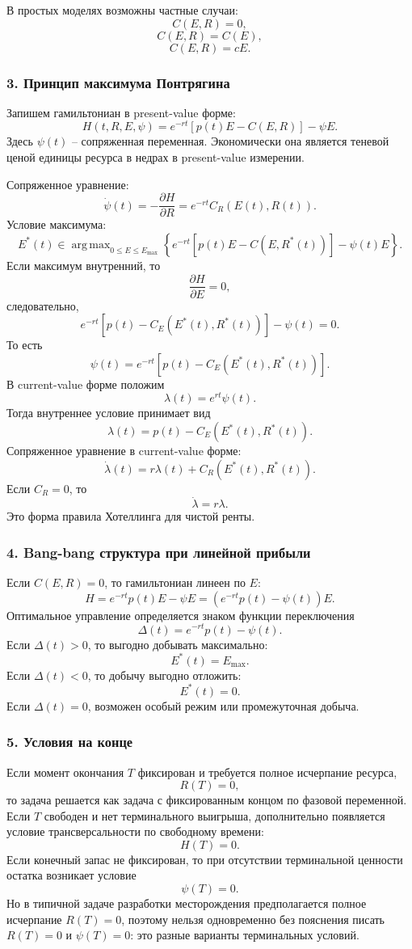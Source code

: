 \documentclass[12pt,a4paper]{article}
\DeclareMathOperator*{\argmax}{arg\,max}
\begin{document}
В простых моделях возможны частные случаи:
\[
C(E,R)=0,
\]
\[
C(E,R)=C(E),
\]
\[
C(E,R)=cE.
\]

\subsubsection*{3. Принцип максимума Понтрягина}
Запишем гамильтониан в present-value форме:
\[
H(t,R,E,\psi)=e^{-rt}\left[p(t)E-C(E,R)\right]-\psi E.
\]
Здесь $\psi(t)$ -- сопряженная переменная. Экономически она является теневой ценой единицы ресурса в недрах в present-value измерении.

Сопряженное уравнение:
\[
\dot\psi(t)=-\frac{\partial H}{\partial R}=e^{-rt}C_R(E(t),R(t)).
\]
Условие максимума:
\[
E^*(t)\in \argmax_{0\le E\le E_{\max}}\left\{e^{-rt}[p(t)E-C(E,R^*(t))]-\psi(t)E\right\}.
\]
Если максимум внутренний, то
\[
\frac{\partial H}{\partial E}=0,
\]
следовательно,
\[
e^{-rt}\left[p(t)-C_E(E^*(t),R^*(t))\right]-\psi(t)=0.
\]
То есть
\[
\psi(t)=e^{-rt}\left[p(t)-C_E(E^*(t),R^*(t))\right].
\]
В current-value форме положим
\[
\lambda(t)=e^{rt}\psi(t).
\]
Тогда внутреннее условие принимает вид
\[
\lambda(t)=p(t)-C_E(E^*(t),R^*(t)).
\]
Сопряженное уравнение в current-value форме:
\[
\dot\lambda(t)=r\lambda(t)+C_R(E^*(t),R^*(t)).
\]
Если $C_R=0$, то
\[
\dot\lambda=r\lambda.
\]
Это форма правила Хотеллинга для чистой ренты.

\subsubsection*{4. Bang-bang структура при линейной прибыли}
Если $C(E,R)=0$, то гамильтониан линеен по $E$:
\[
H=e^{-rt}p(t)E-\psi E=(e^{-rt}p(t)-\psi(t))E.
\]
Оптимальное управление определяется знаком функции переключения
\[
\Delta(t)=e^{-rt}p(t)-\psi(t).
\]
Если $\Delta(t)>0$, то выгодно добывать максимально:
\[
E^*(t)=E_{\max}.
\]
Если $\Delta(t)<0$, то добычу выгодно отложить:
\[
E^*(t)=0.
\]
Если $\Delta(t)=0$, возможен особый режим или промежуточная добыча.

\subsubsection*{5. Условия на конце}
Если момент окончания $T$ фиксирован и требуется полное исчерпание ресурса,
\[
R(T)=0,
\]
то задача решается как задача с фиксированным концом по фазовой переменной. Если $T$ свободен и нет терминального выигрыша, дополнительно появляется условие трансверсальности по свободному времени:
\[
H(T)=0.
\]
Если конечный запас не фиксирован, то при отсутствии терминальной ценности остатка возникает условие
\[
\psi(T)=0.
\]
Но в типичной задаче разработки месторождения предполагается полное исчерпание $R(T)=0$, поэтому нельзя одновременно без пояснения писать $R(T)=0$ и $\psi(T)=0$: это разные варианты терминальных условий.
\end{document}

